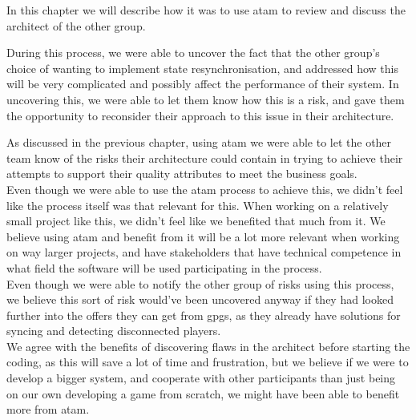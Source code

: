 In this chapter we will describe how it was to use \gls{atam} to review and discuss the architect of the other group.

During this process, we were able to uncover the fact that the other group's choice of wanting to implement state resynchronisation, and addressed how this will be very complicated and possibly affect the performance of their system. In uncovering this, we were able to let them know how this is a risk, and gave them the opportunity to reconsider their approach to this issue in their architecture.

As discussed in the previous chapter, using \gls{atam} we were able to let the other team know of the risks their architecture could contain in trying to achieve their attempts to support their quality attributes to meet the business goals. \\

Even though we were able to use the \gls{atam} process to achieve this, we didn't feel like the process itself was that relevant for this. When working on a relatively small project like this, we didn't feel like we benefited that much from it. We believe using \gls{atam} and benefit from it will be a lot more relevant when working on way larger projects, and have stakeholders that have technical competence in what field the software will be used participating in the process. \\

Even though we were able to notify the other group of risks using this process, we believe this sort of risk would've been uncovered anyway if they had looked further into the offers they can get from \gls{gpgs}, as they already have solutions for syncing and detecting disconnected players. \\

We agree with the benefits of discovering flaws in the architect before starting the coding, as this will save a lot of time and frustration, but we believe if we were to develop a bigger system, and cooperate with other participants than just being on our own developing a game from scratch, we might have been able to benefit more from \gls{atam}.
